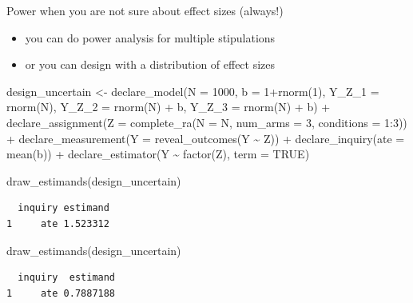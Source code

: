 \documentclass[
  11pt,
  ignorenonframetext,
]{beamer}
\newenvironment{Shaded}{\begin{snugshade}}{\end{snugshade}}
\newcommand{\AttributeTok}[1]{\textcolor[rgb]{0.40,0.45,0.13}{#1}}
\newcommand{\ConstantTok}[1]{\textcolor[rgb]{0.56,0.35,0.01}{#1}}
\newcommand{\DecValTok}[1]{\textcolor[rgb]{0.68,0.00,0.00}{#1}}
\newcommand{\FunctionTok}[1]{\textcolor[rgb]{0.28,0.35,0.67}{#1}}
\newcommand{\NormalTok}[1]{\textcolor[rgb]{0.00,0.23,0.31}{#1}}
\newcommand{\OtherTok}[1]{\textcolor[rgb]{0.00,0.23,0.31}{#1}}
\newcommand{\SpecialCharTok}[1]{\textcolor[rgb]{0.37,0.37,0.37}{#1}}
\providecommand{\tightlist}{%
  \setlength{\itemsep}{0pt}\setlength{\parskip}{0pt}}\usepackage{longtable,booktabs,array}
\begin{document}
\begin{frame}[fragile]{Power when you are not sure about effect sizes
(always!)}
\protect\hypertarget{power-when-you-are-not-sure-about-effect-sizes-always}{}
\begin{itemize}
\tightlist
\item
  you can do power analysis for multiple stipulations
\item
  or you can design with a distribution of effect sizes
\end{itemize}

\begin{Shaded}
\begin{Highlighting}[]
\NormalTok{design\_uncertain }\OtherTok{\textless{}{-}}
  \FunctionTok{declare\_model}\NormalTok{(}\AttributeTok{N =} \DecValTok{1000}\NormalTok{, }\AttributeTok{b =} \DecValTok{1}\SpecialCharTok{+}\FunctionTok{rnorm}\NormalTok{(}\DecValTok{1}\NormalTok{), }\AttributeTok{Y\_Z\_1 =} \FunctionTok{rnorm}\NormalTok{(N), }\AttributeTok{Y\_Z\_2 =} \FunctionTok{rnorm}\NormalTok{(N) }\SpecialCharTok{+}\NormalTok{ b, }\AttributeTok{Y\_Z\_3 =} \FunctionTok{rnorm}\NormalTok{(N) }\SpecialCharTok{+}\NormalTok{ b) }\SpecialCharTok{+}
  \FunctionTok{declare\_assignment}\NormalTok{(}\AttributeTok{Z =} \FunctionTok{complete\_ra}\NormalTok{(}\AttributeTok{N =}\NormalTok{ N, }\AttributeTok{num\_arms =} \DecValTok{3}\NormalTok{, }\AttributeTok{conditions =} \DecValTok{1}\SpecialCharTok{:}\DecValTok{3}\NormalTok{)) }\SpecialCharTok{+}
  \FunctionTok{declare\_measurement}\NormalTok{(}\AttributeTok{Y =} \FunctionTok{reveal\_outcomes}\NormalTok{(Y }\SpecialCharTok{\textasciitilde{}}\NormalTok{ Z)) }\SpecialCharTok{+}
  \FunctionTok{declare\_inquiry}\NormalTok{(}\AttributeTok{ate =} \FunctionTok{mean}\NormalTok{(b)) }\SpecialCharTok{+}
  \FunctionTok{declare\_estimator}\NormalTok{(Y }\SpecialCharTok{\textasciitilde{}} \FunctionTok{factor}\NormalTok{(Z), }\AttributeTok{term =} \ConstantTok{TRUE}\NormalTok{)}

\FunctionTok{draw\_estimands}\NormalTok{(design\_uncertain)}
\end{Highlighting}
\end{Shaded}

\begin{verbatim}
  inquiry estimand
1     ate 1.523312
\end{verbatim}

\begin{Shaded}
\begin{Highlighting}[]
\FunctionTok{draw\_estimands}\NormalTok{(design\_uncertain)}
\end{Highlighting}
\end{Shaded}

\begin{verbatim}
  inquiry  estimand
1     ate 0.7887188
\end{verbatim}
\end{frame}
\end{document}
